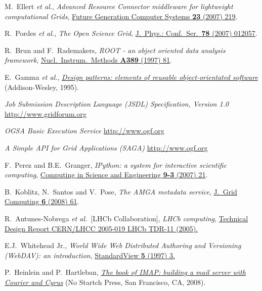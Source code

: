 \documentclass{elsart}
\def\etal {\textit{et al.}}
\begin{document}
\begin{linenumbers}
\begin{thebibliography}{00}
 M.~Ellert \etal,
\textit{Advanced Resource Connector middleware for lightweight
computational Grids},
\href{http://dx.doi.org/10.1016/j.future.2006.05.008}
{Future Generation Computer Systems \textbf{23} (2007) 219}.
  
 R.~Pordes \etal,
\textit{The Open Science Grid},
\href{http://dx.doi.org/10.1088/1742-6596/78/1/012057}
{J.~Phys.: Conf.\ Ser.\ \textbf{78} (2007) 012057}.

 R.~Brun and F.~Rademakers,
\textit{ROOT - an object oriented data analysis framework},
\href{http://dx.doi.org/10.1016/S0168-9002(97)00048-X}
{Nucl.\ Instrum.\ Methods \textbf{A389} (1997) 81}.

  E.~Gamma \etal,
  \href{http://www.pearsonhighered.com/educator/academic/product/0,,0201633612,00%2Ben-USS_01DBC.html}
{\textit{Design patterns: elements of reusable object-orientated software}}
(Addison-Wesley, 1995).


\textit{Job Submission Description Language (JSDL) Specification, Version 1.0}
\href{http://www.gridforum.org/documents/GFD.56.pdf}{http://www.gridforum.org}

\textit{OGSA Basic Execution Service}
\href{www.ogf.org/documents/GFD.108.pdf}{http://www.ogf.org}

\textit{A Simple API for Grid Applications (SAGA)}
\href{http://www.ogf.org/documents/GFD.90.pdf}{http://www.ogf.org}


 F.~Perez and B.E.~Granger,
\textit{IPython: a system for interactive scientific computing},
\href{http://dx.doi.org/10.1109/MCSE.2007.53}
{Computing in Science and Engineering \textbf{9-3} (2007) 21}.

 B.~Koblitz, N.~Santos and V.~Pose,
\textit{The AMGA metadata service},
\href{http://dx.doi.org/10.1007/s10723-007-9084-6}
{J.~Grid Computing \textbf{6} (2008) 61}.

R.~Antunes-Nobrega \etal\ [LHCb Collaboration],
\textit{LHCb computing},
\href{http://cdsweb.cern.ch/record/835156}
{Technical Design Report CERN/LHCC 2005-019 LHCb TDR-11 (2005).}

 E.J.~Whitehead Jr.,
\textit{World Wide Web Distributed Authoring and Versioning (WebDAV):
an introduction},
\href{http://dx.doi.org/10.1145/253452.253458}
{StandardView \textbf{5} (1997) 3.}

 P.~Heinlein and P.~Hartleban,
\href{http://nostarch.com/imap.htm}
{\textit{The book of IMAP: building a mail server with Courier and Cyrus}}
(No Startch Press, San Francisco, CA, 2008).


\end{thebibliography}
\end{linenumbers}
\end{document}
